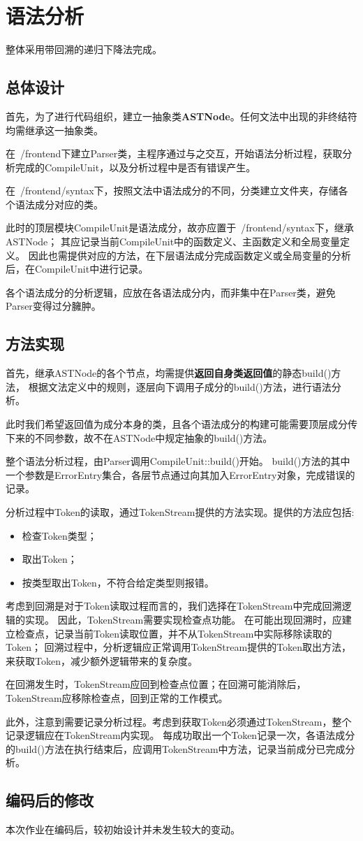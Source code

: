 \section{语法分析}

整体采用带回溯的递归下降法完成。

\subsection{总体设计}

首先，为了进行代码组织，建立一抽象类\textbf{ASTNode}。任何文法中出现的非终结符均需继承这一抽象类。

在~/frontend下建立Parser类，主程序通过与之交互，开始语法分析过程，获取分析完成的CompileUnit，以及分析过程中是否有错误产生。

在~/frontend/syntax下，按照文法中语法成分的不同，分类建立文件夹，存储各个语法成分对应的类。

此时的顶层模块CompileUnit是语法成分，故亦应置于~/frontend/syntax下，继承ASTNode；
其应记录当前CompileUnit中的函数定义、主函数定义和全局变量定义。
因此也需提供对应的方法，在下层语法成分完成函数定义或全局变量的分析后，在CompileUnit中进行记录。

各个语法成分的分析逻辑，应放在各语法成分内，而非集中在Parser类，避免Parser变得过分臃肿。

\subsection{方法实现}

首先，继承ASTNode的各个节点，均需提供\textbf{返回自身类返回值}的静态build()方法，
根据文法定义中的规则，逐层向下调用子成分的build()方法，进行语法分析。

此时我们希望返回值为成分本身的类，且各个语法成分的构建可能需要顶层成分传下来的不同参数，故不在ASTNode中规定抽象的build()方法。

整个语法分析过程，由Parser调用CompileUnit::build()开始。
build()方法的其中一个参数是ErrorEntry集合，各层节点通过向其加入ErrorEntry对象，完成错误的记录。

分析过程中Token的读取，通过TokenStream提供的方法实现。提供的方法应包括:
\begin{itemize}
    \item 检查Token类型；
    \item 取出Token；
    \item 按类型取出Token，不符合给定类型则报错。
\end{itemize}

考虑到回溯是对于Token读取过程而言的，我们选择在TokenStream中完成回溯逻辑的实现。
因此，TokenStream需要实现检查点功能。
在可能出现回溯时，应建立检查点，记录当前Token读取位置，并不从TokenStream中实际移除读取的Token；
回溯过程中，分析逻辑应正常调用TokenStream提供的Token取出方法，来获取Token，减少额外逻辑带来的复杂度。

在回溯发生时，TokenStream应回到检查点位置；在回溯可能消除后，TokenStream应移除检查点，回到正常的工作模式。

此外，注意到需要记录分析过程。考虑到获取Token必须通过TokenStream，整个记录逻辑应在TokenStream内实现。
每成功取出一个Token记录一次，各语法成分的build()方法在执行结束后，应调用TokenStream中方法，记录当前成分已完成分析。

\subsection{编码后的修改}

本次作业在编码后，较初始设计并未发生较大的变动。


